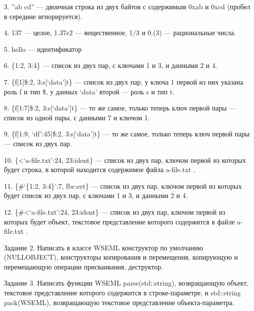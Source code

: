\documentclass{report}
\begin{document}
    3. ''ab cd'' --- двоичная строка из двух байтов с содержимым 0xab и 0xcd (пробел в середине игнорируется).

    4. 137 --- целое, 1.37e2 --- вещественное, 1/3 и 0.(3) --- рациональные числа.

    5. hello --- идентификатор

    6. \{1:2, 3:4\} --- список из двух пар, с ключами 1 и 3, и данными 2 и 4.

    7. \{f[1]\$:2, 3:s[`data']t\} --- список из двух пар, у ключа 1 первой из них указана роль f и тип \$, у данных `data' второй --- роль s и тип t.

    8. \{f[1:7]\$:2, 3:s[`data']t\} --- то же самое, только теперь ключ первой пары --- список из одной пары, с данными 7 и ключом 1.

    9. \{f[1:9, `df':45]\$:2, 3:s[`data']t\} --- то же самое, только теперь ключ первой пары --- список из двух пар.

    10. \{<`a-file.txt':24, 23:ident\} --- список из двух пар, ключом первой из которых будет строка, в которой находится содержимое файла a-file.txt .

    11. \{\#`\{1:2, 3:4\}':7, fbc:ert\} --- список из двух пар, ключом первой из которых будет список из двух пар, с ключами 1 и 3, и данными 2 и 4.

    12. \{\#<`a-file.txt':24, 23:ident\} --- список из двух пар, ключом первой из которых будет объект, текстовое представление которого содержится в файле a-file.txt .

    Задание 2. Написать в классе WSEML конструктор по умолчанию (NULLOBJECT), конструкторы копирования и перемещения, копирующую и перемещающую операции присваивания, деструктор.

    Задание 3. Написать функции WSEML parse(std::string), возвращающую объект, текстовое представление которого содержится в строке-параметре, и std::string pack(WSEML), возвращающую текстовое представление объекта-параметра.
\end{document}

